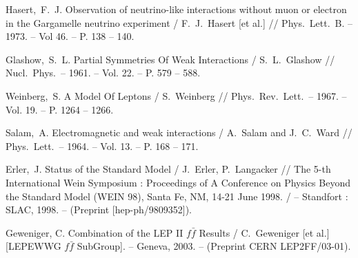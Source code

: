 

  Hasert,~F.~J.
  Observation of neutrino-like interactions without muon or electron in  the
  Gargamelle neutrino experiment /
  F.~J.~Hasert [et al.] //
  Phys.\ Lett.\  B. -- 1973. -- Vol 46. -- P. 138 -- 140.


  Glashow,~S.~L.
  Partial Symmetries Of Weak Interactions
  / S.~L.~Glashow //
  Nucl.\ Phys.\ -- 1961. -- Vol. 22. -- P. 579 -- 588.


  Weinberg,~S.
  A Model Of Leptons
  / S.~Weinberg //
  Phys.\ Rev.\ Lett.\ -- 1967. -- Vol. 19. -- P. 1264 -- 1266.


  Salam,~A.
  Electromagnetic and weak interactions
  / A.~Salam and J.~C.~Ward //
  Phys.\ Lett.\ -- 1964. -- Vol. 13. -- P. 168 -- 171.



 Erler,~J. Status of the Standard Model
 / J.~Erler, P.~Langacker //
 The 5-th International Wein Symposium : Proceedings of A
 Conference on Physics Beyond the Standard Model (WEIN 98), Santa
 Fe, NM, 14-21 June 1998. / -- Standfort : SLAC, 1998.
 -- (Preprint [hep-ph/9809352]).





    Geweniger, C.
    Combination of the LEP II $f\bar f$ Results
    / C.~Geweniger [et al.] [LEPEWWG $f\bar f$ SubGroup].
    -- Geneva, 2003.
    -- (Preprint CERN LEP2FF/03-01).



